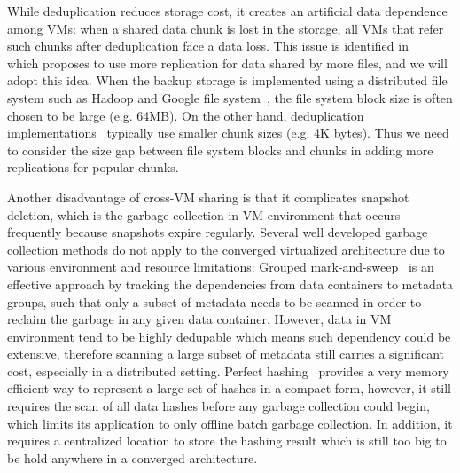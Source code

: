 
While deduplication reduces storage cost, it creates an artificial data dependence among VMs: when a shared data chunk
is lost in the storage, all VMs that refer such chunks after deduplication face a data loss.
This issue is identified in ~\cite{Reliability06} which proposes to use more replication for data shared by more files,
and we will adopt this idea.
When the backup storage is implemented using a distributed file system such as Hadoop and Google file system~\cite{googlefs03},  
the file system block  size is often chosen to be large (e.g. 64MB). On the other hand, 
deduplication implementations~\cite{Guo2011,extreme_binning09,bottleneck08,Jin2009,Dong2011}
 typically use smaller chunk sizes (e.g. 4K bytes).
Thus we need to consider the size gap between file system blocks and chunks  in adding more replications for popular chunks. 

Another disadvantage of cross-VM sharing is that it complicates
snapshot deletion, which is the garbage collection in VM environment
that occurs frequently because snapshots expire regularly.
Several well developed garbage collection methods do not apply to the
converged virtualized architecture due to various environment and resource limitations:
Grouped mark-and-sweep~\cite{Guo2011} is an effective approach by tracking
the dependencies from data containers to metadata groups, such that only a subset of
metadata needs to be scanned in order to reclaim the garbage in any given data container.
However, data in VM environment tend to be highly dedupable which means
such dependency could be extensive, therefore scanning a large subset of metadata still carries a significant cost,
 especially in a distributed setting.
Perfect hashing~\cite{Fabiano2013} provides a very memory efficient way to represent a large set of
hashes in a compact form, however, it still requires the scan of all data hashes before any garbage collection could begin,
which limits its application to only offline batch garbage collection. In addition, it requires a centralized location
to store the hashing result which is still too big to be hold anywhere in a converged architecture.



